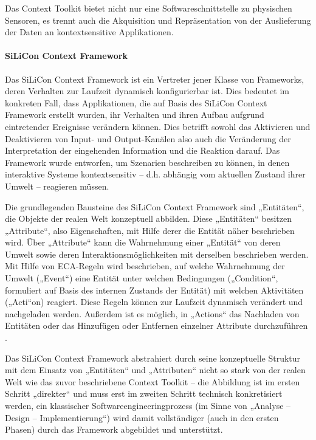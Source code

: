 Das Context Toolkit bietet nicht nur eine Softwareschnittstelle zu physischen Sensoren, es trennt auch die Akquisition und Repräsentation von der Auslieferung der Daten an kontextsensitive Applikationen.

\paragraph{SiLiCon Context Framework} %
\label{par:silicon_context_framework}

Das SiLiCon Context Framework \citep{Beer03} ist ein Vertreter jener Klasse von Frameworks, deren Verhalten zur Laufzeit dynamisch konfigurierbar ist. Dies bedeutet im konkreten Fall, dass Applikationen, die auf Basis des SiLiCon Context Framework erstellt wurden, ihr Verhalten und ihren Aufbau aufgrund eintretender Ereignisse verändern können. Dies betrifft sowohl das Aktivieren und Deaktivieren von Input- und Output-Kanälen also auch die Veränderung der Interpretation der eingehenden Information und die Reaktion darauf. Das Framework wurde entworfen, um Szenarien beschreiben zu können, in denen interaktive Systeme kontextsensitiv -- d.h. abhängig vom aktuellen Zustand ihrer Umwelt -- reagieren müssen.

Die grundlegenden Bausteine des SiLiCon Context Framework sind „Entitäten“, die Objekte der realen Welt konzeptuell abbilden. Diese „Entitäten“ besitzen „Attribute“, also Eigenschaften, mit Hilfe derer die Entität näher beschrieben wird. Über „Attribute“ kann die Wahrnehmung einer „Entität“ von deren Umwelt sowie deren Interaktionsmöglichkeiten mit derselben beschrieben werden. Mit Hilfe von \gls{ECA}-Regeln  wird beschrieben, auf welche Wahrnehmung der Umwelt („Event“) eine Entität unter welchen Bedingungen („Condition“, formuliert auf Basis des internen Zustands der Entität) mit welchen Aktivitäten („Acti“on) reagiert. Diese Regeln können zur Laufzeit dynamisch verändert und nachgeladen werden. Außerdem ist es möglich, in „Actions“ das Nachladen von Entitäten oder das Hinzufügen oder Entfernen einzelner Attribute durchzuführen \citep[][S. 90]{Oppl04}.

Das SiLiCon Context Framework abstrahiert durch seine konzeptuelle Struktur mit dem Einsatz von „Entitäten“ und „Attributen“ nicht so stark von der realen Welt wie das zuvor beschriebene Context Toolkit -- die Abbildung ist im ersten Schritt „direkter“ und muss erst im zweiten Schritt technisch konkretisiert werden, ein klassischer Softwareengineeringprozess (im Sinne von „Analyse -- Design -- Implementierung“) wird damit vollständiger (auch in den ersten Phasen) durch das Framework abgebildet und unterstützt. 

